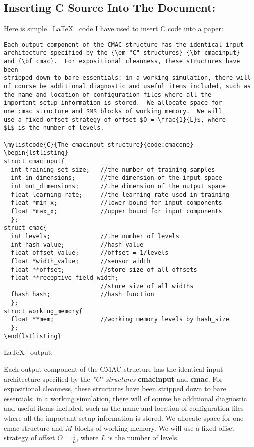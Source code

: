 \documentclass[11pt]{SelfArxOneColBMN}
\begin{document}
\subsection{Inserting C Source Into The Document:}

Here is simple ~\LaTeX~ code I have used to
insert C code into a paper:

\singlespacing 
\begin{Verbatim}
Each output component of the CMAC structure has the identical input
architecture specified by the {\em "C" structures} {\bf cmacinput}
and {\bf cmac}.  For expositional cleanness, these structures have been
stripped down to bare essentials: in a working simulation, there will
of course be additional diagnostic and useful items included, such as
the name and location of configuration files where all the
important setup information is stored.  We allocate space for
one cmac structure and $M$ blocks of working memory.  We will
use a fixed offset strategy of offset $O = \frac{1}{L}$, where
$L$ is the number of levels.

\mylistcode{C}{The cmacinput structure}{code:cmacone}
\begin{lstlisting}
struct cmacinput{ 
  int training_set_size;   //the number of training samples 
  int in_dimensions;       //the dimension of the input space 
  int out_dimensions;      //the dimension of the output space 
  float learning_rate;     //the learning rate used in training 
  float *min_x;            //lower bound for input components  
  float *max_x;            //upper bound for input components 
  }; 
struct cmac{ 
  int levels;              //the number of levels  
  int hash_value;          //hash value 
  float offset_value;      //offset = 1/levels 
  float *width_value;      //sensor width 
  float **offset;          //store size of all offsets 
  float **receptive_field_width; 
                           //store size of all widths 
  fhash hash;              //hash function 
  }; 
struct working_memory{      
  float **mem;             //working memory levels by hash_size 
  };   
\end{lstlisting}
\end{Verbatim}
\onehalfspacing

\noindent
\LaTeX~ output:

Each output component of the CMAC structure has the identical input
architecture specified by the {\em "C" structures} {\bf cmacinput}
and {\bf cmac}.  For expositional cleanness, these structures have been
stripped down to bare essentials: in a working simulation, there will
of course be additional diagnostic and useful items included, such as
the name and location of configuration files where all the
important setup information is stored.  We allocate space for
one cmac structure and $M$ blocks of working memory.  We will
use a fixed offset strategy of offset $O = \frac{1}{L}$, where
$L$ is the number of levels.
\end{document}
